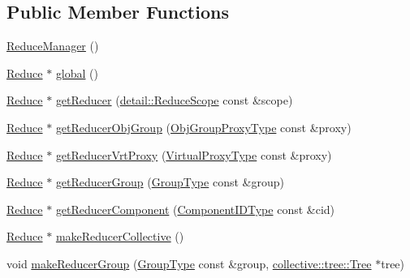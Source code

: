 \subsection*{Public Member Functions}
\begin{DoxyCompactItemize}
\item 
\hyperlink{structvt_1_1collective_1_1reduce_1_1_reduce_manager_a28e777d1b70bc4e2d369db4ed3df76ab}{Reduce\+Manager} ()
\item 
\hyperlink{structvt_1_1collective_1_1reduce_1_1_reduce}{Reduce} $\ast$ \hyperlink{structvt_1_1collective_1_1reduce_1_1_reduce_manager_afa3c814ff0e1c7ef1a9f76ed4036512b}{global} ()
\item 
\hyperlink{structvt_1_1collective_1_1reduce_1_1_reduce}{Reduce} $\ast$ \hyperlink{structvt_1_1collective_1_1reduce_1_1_reduce_manager_ad502c08497db1a1d811e1cad034f4891}{get\+Reducer} (\hyperlink{structvt_1_1collective_1_1reduce_1_1detail_1_1_reduce_scope}{detail\+::\+Reduce\+Scope} const \&scope)
\item 
\hyperlink{structvt_1_1collective_1_1reduce_1_1_reduce}{Reduce} $\ast$ \hyperlink{structvt_1_1collective_1_1reduce_1_1_reduce_manager_a712bf763fda2a663e87edc524f99839f}{get\+Reducer\+Obj\+Group} (\hyperlink{namespacevt_ad7cae989df485fccca57f0792a880a8e}{Obj\+Group\+Proxy\+Type} const \&proxy)
\item 
\hyperlink{structvt_1_1collective_1_1reduce_1_1_reduce}{Reduce} $\ast$ \hyperlink{structvt_1_1collective_1_1reduce_1_1_reduce_manager_aa6a24ee9cccbc984031bc834471429a9}{get\+Reducer\+Vrt\+Proxy} (\hyperlink{namespacevt_a1b417dd5d684f045bb58a0ede70045ac}{Virtual\+Proxy\+Type} const \&proxy)
\item 
\hyperlink{structvt_1_1collective_1_1reduce_1_1_reduce}{Reduce} $\ast$ \hyperlink{structvt_1_1collective_1_1reduce_1_1_reduce_manager_afedfe0dbb9fcbe6120a310ac8f4ad9b0}{get\+Reducer\+Group} (\hyperlink{namespacevt_a27b5e4411c9b6140c49100e050e2f743}{Group\+Type} const \&group)
\item 
\hyperlink{structvt_1_1collective_1_1reduce_1_1_reduce}{Reduce} $\ast$ \hyperlink{structvt_1_1collective_1_1reduce_1_1_reduce_manager_ae154a987a32dfa8c86e0391a2915579d}{get\+Reducer\+Component} (\hyperlink{namespacevt_ab6ac935c168b809c422d5121da4f2700}{Component\+I\+D\+Type} const \&cid)
\item 
\hyperlink{structvt_1_1collective_1_1reduce_1_1_reduce}{Reduce} $\ast$ \hyperlink{structvt_1_1collective_1_1reduce_1_1_reduce_manager_a4b81ceab5d9f081f393dd68cece25935}{make\+Reducer\+Collective} ()
\item 
void \hyperlink{structvt_1_1collective_1_1reduce_1_1_reduce_manager_a44fa84680d3b310f4cb3f6c776a31751}{make\+Reducer\+Group} (\hyperlink{namespacevt_a27b5e4411c9b6140c49100e050e2f743}{Group\+Type} const \&group, \hyperlink{structvt_1_1collective_1_1tree_1_1_tree}{collective\+::tree\+::\+Tree} $\ast$tree)
\end{DoxyCompactItemize}

